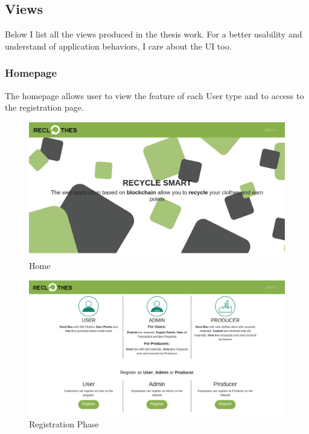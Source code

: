 \newpage
\subsection{Views}

Below I list all the views produced in the thesis work. For a better usability and understand of application behaviors,
I care about the UI too. 

\subsubsection{Homepage}

The homepage allows user to view the feature of each User type and to access to the registration page.

\begin{figure}[h!]
    \centering
    \includegraphics[totalheight=7.5cm]{img/dapp/home1.png}
    \caption{Home}
    \label{fig:home}
\end{figure}

\begin{figure}[h!]
    \centering
    \includegraphics[totalheight=7.5cm]{img/dapp/home2.png}
    \caption{Registration Phase}
    \label{fig:registration}
\end{figure}

